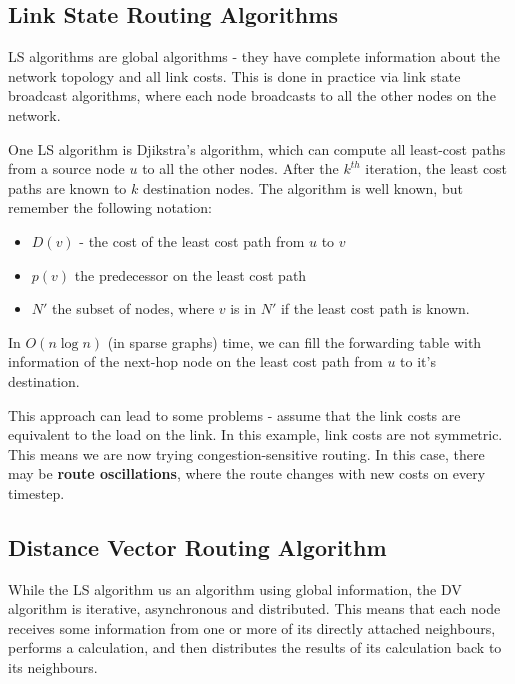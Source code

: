\documentclass[12pt,letterpaper]{book}
\theoremstyle{definition}
\begin{document}
\subsection{Link State Routing Algorithms}

LS algorithms are global algorithms - they have complete information about the network topology and all link costs. This is done in practice via link state broadcast algorithms, where each node broadcasts to all the other nodes on the network.

One LS algorithm is Djikstra's algorithm, which can compute all least-cost paths from a source node $u$ to all the other nodes. After the $k^{th}$ iteration, the least cost paths are known to $k$ destination nodes. The algorithm is well known, but remember the following notation:
\begin{itemize}
  \item $D(v)$ - the cost of the least cost path from $u$ to $v$
  \item $p(v)$ the predecessor on the least cost path
  \item $N'$ the subset of nodes, where $v$ is in $N'$ if the least cost path is known.
\end{itemize}

In $O(n \log n)$ (in sparse graphs) time, we can fill the forwarding table with information of the next-hop node on the least cost path from $u$ to it's destination.

This approach can lead to some problems - assume that the link costs are equivalent to the load on the link. In this example, link costs are not symmetric. This means we are now trying congestion-sensitive routing. In this case, there may be \textbf{route oscillations}, where the route changes with new costs on every timestep.

\subsection{Distance Vector Routing Algorithm}

While the LS algorithm us an algorithm using global information, the DV algorithm is iterative, asynchronous and distributed. This means that each node receives some information from one or more of its directly attached neighbours, performs a calculation, and then distributes the results of its calculation back to its neighbours.
\end{document}
